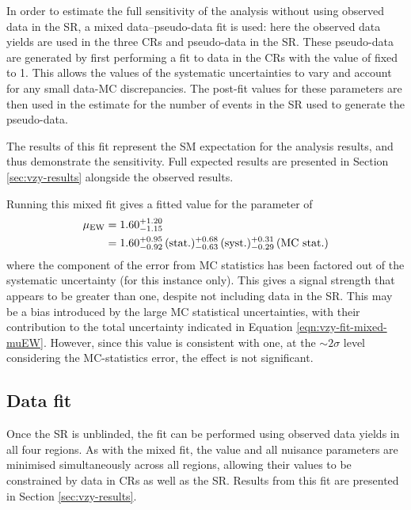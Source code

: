 In order to estimate the full sensitivity of the analysis without using observed
data in the \ac{SR}, a mixed data--pseudo-data fit is used: here the observed data
yields are used in the three \acp{CR} and pseudo-data in the \ac{SR}. These
pseudo-data are generated by first performing a fit to data in the \acp{CR}
with the value of \muEW fixed to 1. This allows the values of the systematic
uncertainties to vary and account for any small data-\ac{MC} discrepancies. The
post-fit values for these parameters are then used in the estimate for the
number of events in the \ac{SR} used to generate the pseudo-data.

The results of this fit represent the \ac{SM} expectation for the analysis
results, and thus demonstrate the sensitivity. Full expected results are
presented in Section \ref{sec:vzy-results} alongside the observed results.

Running this mixed fit gives a fitted value for the \muEW parameter of
%
\begin{equation}
  \begin{split}
  \mu_{\text{EW}} &= 1.60 ^{+1.20}_{-1.15} \\
        &= 1.60 ^{+0.95}_{-0.92} \,(\text{stat.})
                ^{+0.68}_{-0.63} \,(\text{syst.})
                ^{+0.31}_{-0.29} \,(\text{MC stat.})
  \end{split}
  \label{eqn:vzy-fit-mixed-muEW}
\end{equation}
%
where the component of the error from \ac{MC} statistics has been factored out
of the systematic uncertainty (for this instance only).
This gives a signal strength that appears to be greater than one,
despite not
including data in the \ac{SR}. This may be a bias introduced by the large \ac{MC}
statistical uncertainties, with their contribution to the total uncertainty
indicated in Equation \ref{eqn:vzy-fit-mixed-muEW}.
However, since this \muEW value is consistent with one, at the $\sim2\sigma$
level considering the \ac{MC}-statistics error, the effect is not significant.

\subsection{Data fit}

Once the \ac{SR} is unblinded, the fit can be performed using observed data
yields in all four regions. As with the mixed fit, the \muEW value and all
nuisance parameters are minimised simultaneously across all regions, allowing
their values to be constrained by data in \acp{CR} as well as the \ac{SR}.
Results from this fit are presented in Section \ref{sec:vzy-results}.

